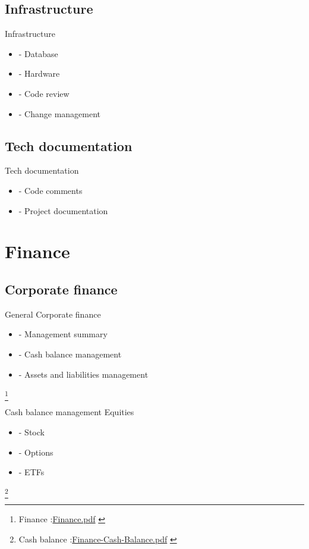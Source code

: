 \documentclass[8pt]{beamer}
\begin{document}
\subsection{Infrastructure}

\begin{frame}{Infrastructure}
  \begin{itemize}
  \item
- Database 
  \item
- Hardware 
  \item
- Code review
  \item
- Change management 
  \end{itemize}
\end{frame}

\subsection{Tech documentation}

\begin{frame}{Tech documentation}
  \begin{itemize}
  \item
- Code comments
  \item
- Project documentation 
  \end{itemize}
\end{frame}

\section{Finance}
\subsection{Corporate finance}

\begin{frame}{General}
Corporate finance
  \begin{itemize}
  \item
- Management summary 
  \item
- Cash balance management 
  \item
- Assets and liabilities management 
  \end{itemize}
\footnote{
\tiny{Finance :\url{Finance.pdf} }
}
\end{frame}

\begin{frame}{Cash balance management}
Equities
  \begin{itemize}
  \item
- Stock 
  \item
- Options 
  \item
- ETFs
  \end{itemize}
\footnote{
\tiny{Cash balance :\url{Finance-Cash-Balance.pdf} }
}
\end{frame}
\end{document}
